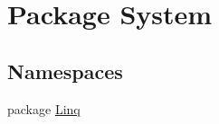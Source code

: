 \hypertarget{namespace_system}{\section{Package System}
\label{namespace_system}
}
\subsection*{Namespaces}
\begin{DoxyCompactItemize}
\item 
package \hyperlink{namespace_system_1_1_linq}{Linq}
\end{DoxyCompactItemize}

